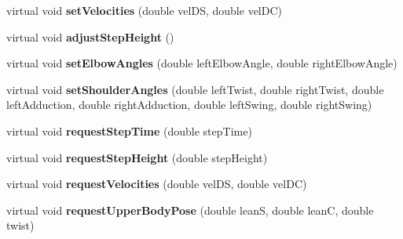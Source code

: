 \begin{DoxyCompactItemize}
\item 
\hypertarget{classCartWheel_1_1Core_1_1CompositeBehaviourController_ac56f358abc3efb8f77b723fab61e122f}{
virtual void {\bfseries setVelocities} (double velDS, double velDC)}
\label{classCartWheel_1_1Core_1_1CompositeBehaviourController_ac56f358abc3efb8f77b723fab61e122f}

\item 
\hypertarget{classCartWheel_1_1Core_1_1CompositeBehaviourController_a8fe7669164bd30c5c79b8cd74b5f4de5}{
virtual void {\bfseries adjustStepHeight} ()}
\label{classCartWheel_1_1Core_1_1CompositeBehaviourController_a8fe7669164bd30c5c79b8cd74b5f4de5}

\item 
\hypertarget{classCartWheel_1_1Core_1_1CompositeBehaviourController_a5e9a1cee9cd7de93a99920ecbe30d5e3}{
virtual void {\bfseries setElbowAngles} (double leftElbowAngle, double rightElbowAngle)}
\label{classCartWheel_1_1Core_1_1CompositeBehaviourController_a5e9a1cee9cd7de93a99920ecbe30d5e3}

\item 
\hypertarget{classCartWheel_1_1Core_1_1CompositeBehaviourController_a7a172faee6a3409d5dabc7c1be511056}{
virtual void {\bfseries setShoulderAngles} (double leftTwist, double rightTwist, double leftAdduction, double rightAdduction, double leftSwing, double rightSwing)}
\label{classCartWheel_1_1Core_1_1CompositeBehaviourController_a7a172faee6a3409d5dabc7c1be511056}

\item 
\hypertarget{classCartWheel_1_1Core_1_1CompositeBehaviourController_a5ea623f720e4de82896b917f88bb326a}{
virtual void {\bfseries requestStepTime} (double stepTime)}
\label{classCartWheel_1_1Core_1_1CompositeBehaviourController_a5ea623f720e4de82896b917f88bb326a}

\item 
\hypertarget{classCartWheel_1_1Core_1_1CompositeBehaviourController_aa3715256497843d29ed87d47c014c090}{
virtual void {\bfseries requestStepHeight} (double stepHeight)}
\label{classCartWheel_1_1Core_1_1CompositeBehaviourController_aa3715256497843d29ed87d47c014c090}

\item 
\hypertarget{classCartWheel_1_1Core_1_1CompositeBehaviourController_ad19ee1fb94b0fd9770efd45fb71036f0}{
virtual void {\bfseries requestVelocities} (double velDS, double velDC)}
\label{classCartWheel_1_1Core_1_1CompositeBehaviourController_ad19ee1fb94b0fd9770efd45fb71036f0}

\item 
\hypertarget{classCartWheel_1_1Core_1_1CompositeBehaviourController_ac0bcbb54c769961fe2e25f7362b4806f}{
virtual void {\bfseries requestUpperBodyPose} (double leanS, double leanC, double twist)}
\label{classCartWheel_1_1Core_1_1CompositeBehaviourController_ac0bcbb54c769961fe2e25f7362b4806f}


\end{DoxyCompactItemize}
